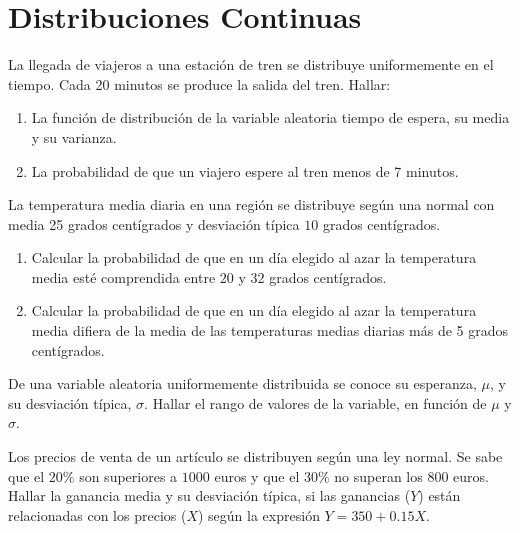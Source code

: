 \newpage
\section{Distribuciones Continuas}


\begin{ejercicio}
    La llegada de viajeros a una estación de tren se distribuye uniformemente en el tiempo. Cada 20 minutos se produce la salida del tren. Hallar:
    \begin{enumerate}
        \item La función de distribución de la variable aleatoria tiempo de espera, su media y su varianza.
        \item La probabilidad de que un viajero espere al tren menos de 7 minutos.
    \end{enumerate}
\end{ejercicio}

\begin{ejercicio}
    La temperatura media diaria en una región se distribuye según una normal con media 25 grados centígrados y desviación típica $10$ grados centígrados.
    \begin{enumerate}
        \item Calcular la probabilidad de que en un día elegido al azar la temperatura media esté comprendida entre $20$ y $32$ grados centígrados.
        \item Calcular la probabilidad de que en un día elegido al azar la temperatura media difiera de la media de las temperaturas medias diarias más de 5 grados centígrados.
    \end{enumerate}
\end{ejercicio}

\begin{ejercicio}
    De una variable aleatoria uniformemente distribuida se conoce su esperanza, $\mu$, y su desviación típica, $\sigma$. Hallar el rango de valores de la variable, en función de $\mu$ y $\sigma$.
\end{ejercicio}

\begin{ejercicio}
    Los precios de venta de un artículo se distribuyen según una ley normal. Se sabe que el $20\%$ son superiores a $1000$ euros y que el $30\%$ no superan los $800$ euros. Hallar la ganancia media y su desviación típica, si las ganancias ($Y$) están relacionadas con los precios ($X$) según la expresión $Y = 350+0.15X$.
\end{ejercicio}


